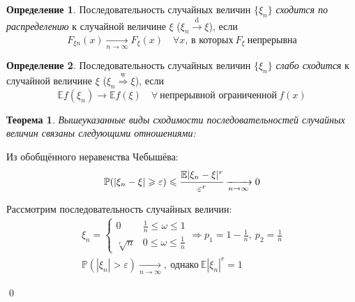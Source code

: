 \documentclass[oneside,final,14pt]{extreport}
\renewenvironment{proof}{{\bfseries Доказательство.}}{\qed}
\newtheorem{thm}{Теорема}[section]
\theoremstyle{definition}
\newtheorem{defn}{Определение}[section]
\begin{document}
\begin{defn}
    Последовательность случайных величин $\{\xi_n\}$ {\it сходится по распределению} к случайной величине $\xi$ ($\xi_n \xrightarrow[]{\text{d}} \xi$), если
    \begin{equation*}
        F_{\xi n}(x) \xrightarrow[n \to \infty]{} F_{\xi}(x) \quad \forall x, \, \text{в которых}~ F_{\xi} ~\text{непрерывна}
    \end{equation*}
\end{defn}

\begin{defn}
    Последовательность случайных величин $\{\xi_n\}$ {\it слабо сходится} к случайной величине $\xi$ ($\xi_n \stackrel{\text{w}}{\Rightarrow} \xi$), если
    \begin{equation*}
        \mathbb{E} f\left(\xi_{n}\right) \rightarrow \mathbb{E} f(\xi) \quad \forall~ \text{непрерывной ограниченной}~ f(x)
    \end{equation*}
\end{defn}
\pagebreak
\begin{thm}
    Вышеуказанные виды сходимости последовательностей случайных величин связаны следующими отношениями:
    
\end{thm}

\begin{proof}\par
     Из обобщённого неравенства Чебышёва:
    \begin{equation*}
        \mathbb{P}(|\xi_n - \xi| \geqslant \varepsilon) \leqslant \cfrac{\mathbb{E}|\xi_n - \xi|^{r}}{\varepsilon^{r}} \xrightarrow[n \to \infty]{} 0
    \end{equation*}
    
     Рассмотрим последовательность случайных величин:
    \begin{gather*}
        \xi_n = \left\{\begin{array}{ll}
                0 &  \frac{1}{n} \leqslant \omega \leqslant 1 \\
                \sqrt[r]{n} & 0 \leqslant \omega \leqslant \frac{1}{n}
        \end{array}\right. \Rightarrow p_1 = 1 - \frac{1}{n},~ p_2 = \frac{1}{n} \\
        \mathbb{P}(|\xi_n| > \varepsilon) \xrightarrow[n \to \infty]{},~ \text{однако}~\mathbb{E}|\xi_n|^{r}=1
    \end{gather*}
    
\end{proof}
\end{document}
